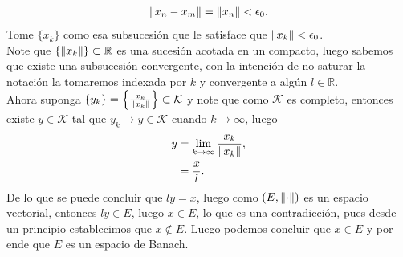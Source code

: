 \begin{homeworkProblem}
\begin{solution}
    \begin{align*}
      \left\|x_n-x_m\right\|=\left\|x_n\right\|<\epsilon_0.
    \end{align*}
    Tome $\{x_k\}$ como esa subsucesión que le satisface que $\left\|x_k\right\|<\epsilon_0$.\\
    Note que $\{\left\|x_k\right\|\}\subset \mathbb{R}$ es una sucesión acotada en un compacto, luego sabemos que existe una subsucesión convergente, con la intención de no saturar la notación la tomaremos indexada por $k$ y convergente a algún $l\in\mathbb{R}$.\\
    Ahora suponga $\{y_k\}=\left\{\frac{x_k}{\left\|x_k\right\|}\right\}\subset\mathcal{K}$ y note que como $\mathcal{K}$ es completo, entonces existe $y\in \mathcal{K}$ tal que $y_k\to y\in \mathcal{K}$ cuando $k\to\infty$, luego
    \begin{align*}
      y&=\lim_{k \to \infty}\frac{x_k}{\left\|x_k\right\|},\\
      &=\frac{x}{l}.
    \end{align*}
    De lo que se puede concluir que $ly=x$, luego como $(E,\left\|\cdot\right\|)$ es un espacio vectorial, entonces $ly\in E$, luego $x\in E$, lo que es una contradicción, pues desde un principio establecimos que $x\notin E$. Luego podemos concluir que $x\in E$ y por ende que $E$ es un espacio de Banach. 
  \end{solution}
\end{homeworkProblem}
